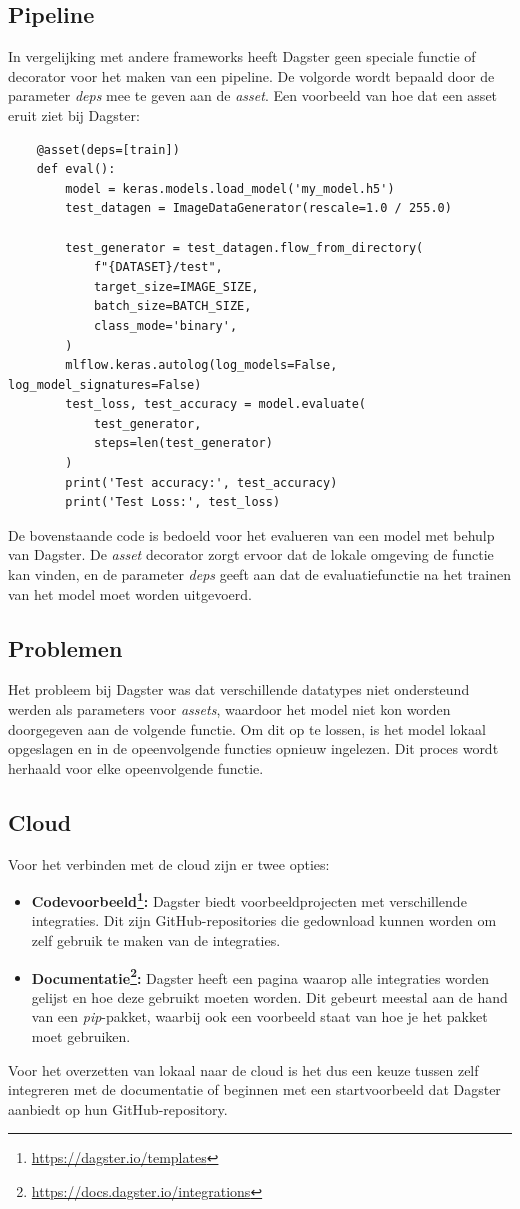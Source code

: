 \subsection{Pipeline}
In vergelijking met andere frameworks heeft Dagster geen speciale functie of decorator voor het maken van een pipeline. De volgorde wordt bepaald door de parameter \textit{deps} mee te geven aan de \textit{asset}.
Een voorbeeld van hoe dat een asset eruit ziet bij Dagster:
\begin{verbatim}
    @asset(deps=[train])
    def eval():
        model = keras.models.load_model('my_model.h5')
        test_datagen = ImageDataGenerator(rescale=1.0 / 255.0)

        test_generator = test_datagen.flow_from_directory(
            f"{DATASET}/test",
            target_size=IMAGE_SIZE,
            batch_size=BATCH_SIZE,
            class_mode='binary',
        )
        mlflow.keras.autolog(log_models=False, log_model_signatures=False)
        test_loss, test_accuracy = model.evaluate(
            test_generator,
            steps=len(test_generator)
        )
        print('Test accuracy:', test_accuracy)
        print('Test Loss:', test_loss)
\end{verbatim}
De bovenstaande code is bedoeld voor het evalueren van een model met behulp van Dagster. De \textit{asset} decorator zorgt ervoor dat de lokale omgeving de functie kan vinden, en de parameter \textit{deps} geeft aan dat de evaluatiefunctie na het trainen van het model moet worden uitgevoerd.
\subsection{Problemen}
Het probleem bij Dagster was dat verschillende datatypes niet ondersteund werden als parameters voor \textit{assets}, waardoor het model niet kon worden doorgegeven aan de volgende functie. Om dit op te lossen, is het model lokaal opgeslagen en in de opeenvolgende functies opnieuw ingelezen. Dit proces wordt herhaald voor elke opeenvolgende functie.
\subsection{Cloud}
Voor het verbinden met de cloud zijn er twee opties:
\begin{itemize}
    \item \textbf{Codevoorbeeld\footnote{\url{https://dagster.io/templates}}:} Dagster biedt voorbeeldprojecten met verschillende integraties. Dit zijn GitHub-repositories die gedownload kunnen worden om zelf gebruik te maken van de integraties.
    \item \textbf{Documentatie\footnote{\url{https://docs.dagster.io/integrations}}:} Dagster heeft een pagina waarop alle integraties worden gelijst en hoe deze gebruikt moeten worden. Dit gebeurt meestal aan de hand van een \textit{pip}-pakket, waarbij ook een voorbeeld staat van hoe je het pakket moet gebruiken.
\end{itemize}

Voor het overzetten van lokaal naar de cloud is het dus een keuze tussen zelf integreren met de documentatie of beginnen met een startvoorbeeld dat Dagster aanbiedt op hun GitHub-repository.